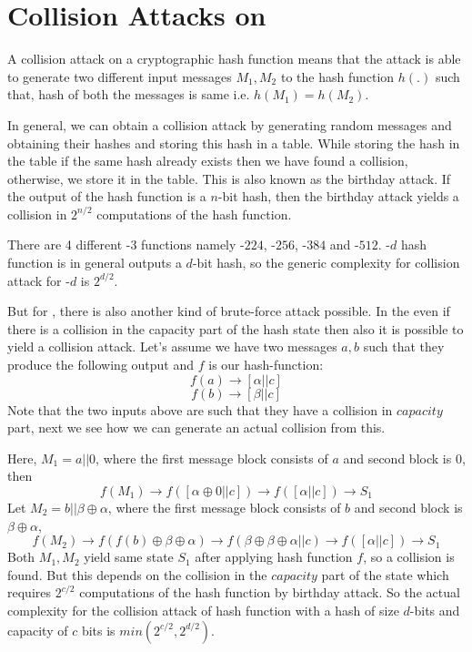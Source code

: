 \section{Collision Attacks on \KECCAK{}}

A collision attack on a cryptographic hash function means that the attack is able to generate two different input messages $M_1, M_2$ to the hash function $h(.)$ such that, hash of both the messages is same i.e. $h(M_1) = h(M_2)$.

In general, we can obtain a collision attack by generating random messages and obtaining their hashes and storing this hash in a table. While storing the hash in the table if the same hash already exists then we have found a collision, otherwise, we store it in the table. This is also known as the birthday attack. If the output of the hash function is a $n$-bit hash, then the birthday attack yields a collision in $2^{n/2}$ computations of the hash function.

There are 4 different \SHA-$3$ functions namely -$224$, -$256$, -$384$ and -$512$. -$d$ hash function is in general outputs a $d$-bit hash, so the generic complexity for collision attack for -$d$ is $2^{d/2}$.

But for \KECCAK{}, there is also another kind of brute-force attack possible. In the \KECCAK{} even if there is a collision in the capacity part of the hash state then also it is possible to yield a collision attack. Let's assume we have two messages $a, b$ such that they produce the following output and $f$ is our hash-function:
\[
    f(a) \rightarrow \left[ \alpha || c \right]
\]
\[
    f(b) \rightarrow \left[ \beta || c \right]
\]
Note that the two inputs above are such that they have a collision in $capacity$ part, next we see how we can generate an actual collision from this.

Here, $M_1 = a || 0$, where the first message block consists of $a$ and second block is $0$, then
\[
    f(M_1) \rightarrow f\left( \left[ \alpha \oplus 0 || c \right] \right) \rightarrow f\left( \left[ \alpha || c \right] \right) \rightarrow S_1
\]
Let $M_2 = b || \beta \oplus \alpha$, where the first message block consists of $b$ and second block is $\beta \oplus \alpha$, 
\[
    f(M_2) \rightarrow f\left( f(b) \oplus \beta \oplus \alpha \right) \rightarrow f\left( \beta \oplus \beta \oplus \alpha || c \right) \rightarrow f\left( \left[\alpha || c\right] \right) \rightarrow S_1
\]
Both $M_1, M_2$ yield same state $S_1$ after applying hash function $f$, so a collision is found. But this depends on the collision in the $capacity$ part of the state which requires $2^{c/2}$ computations of the hash function by birthday attack. So the actual complexity for the collision attack of \KECCAK{} hash function with a hash of size $d$-bits and capacity of $c$ bits is $min\left( 2^{c/2}, 2^{d/2}\right)$.

